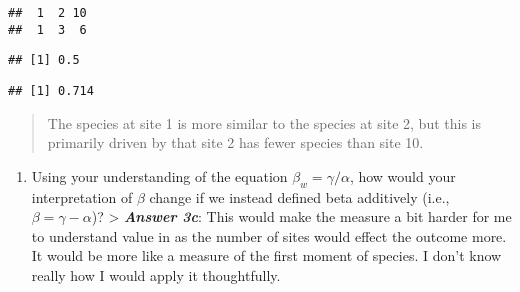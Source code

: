\documentclass[
]{article}
\newenvironment{Shaded}{\begin{snugshade}}{\end{snugshade}}
\newcommand{\DecValTok}[1]{\textcolor[rgb]{0.00,0.00,0.81}{#1}}
\newcommand{\FunctionTok}[1]{\textcolor[rgb]{0.00,0.00,0.00}{#1}}
\newcommand{\NormalTok}[1]{#1}
\newcommand{\SpecialCharTok}[1]{\textcolor[rgb]{0.00,0.00,0.00}{#1}}
\providecommand{\tightlist}{%
  \setlength{\itemsep}{0pt}\setlength{\parskip}{0pt}}
\begin{document}
\begin{Shaded}
\end{Shaded}

\begin{verbatim}
##  1  2 10 
##  1  3  6
\end{verbatim}

\begin{Shaded}
\end{Shaded}

\begin{verbatim}
## [1] 0.5
\end{verbatim}

\begin{Shaded}
\end{Shaded}

\begin{verbatim}
## [1] 0.714
\end{verbatim}

\begin{quote}
The species at site 1 is more similar to the species at site 2, but this
is primarily driven by that site 2 has fewer species than site 10.
\end{quote}

\begin{enumerate}
\def\labelenumi{\alph{enumi}.}
\setcounter{enumi}{2}
\tightlist
\item
  Using your understanding of the equation
  \(\beta_{w} = \gamma/\alpha\), how would your interpretation of
  \(\beta\) change if we instead defined beta additively (i.e.,
  \(\beta = \gamma - \alpha\))? \textgreater{} \textbf{\emph{Answer
  3c}}: This would make the measure a bit harder for me to understand
  value in as the number of sites would effect the outcome more. It
  would be more like a measure of the first moment of species. I don't
  know really how I would apply it thoughtfully.
\end{enumerate}
\end{document}

